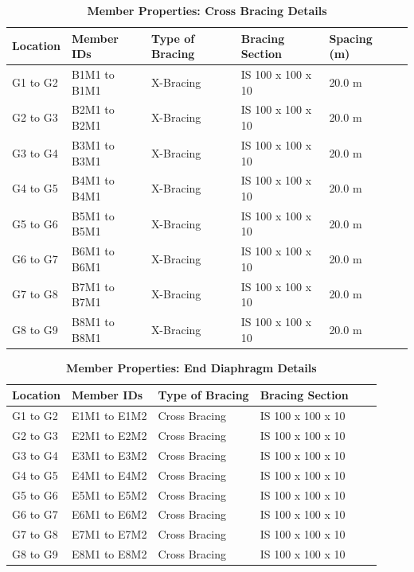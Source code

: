 \documentclass[12pt,a4paper]{report}
\numberwithin{table}{chapter}
\numberwithin{figure}{chapter}
\begin{document}
\newpage

\vspace{0.4em}
\setlength{\tabcolsep}{4pt}
\setlength\LTleft{0pt}
\setlength\LTright{\fill}

\begin{longtable}{|L{2.2cm}|L{2.2cm}|L{3.0cm}|L{2.5cm}|C{1.8cm}|C{1.8cm}|}
\caption{\textbf{Member Properties: Cross Bracing Details}}
\hline
\textbf{Location} & \textbf{Member IDs} & \textbf{Type of Bracing} & \textbf{Bracing Section} & \textbf{Spacing (m)} \\
\hline
G1 to G2 & B1M1 to B1M1 & X-Bracing & IS 100 x 100 x 10 & 20.0 m \\[6pt]
\hline
G2 to G3 & B2M1 to B2M1 & X-Bracing & IS 100 x 100 x 10 & 20.0 m \\[6pt]
\hline
G3 to G4 & B3M1 to B3M1 & X-Bracing & IS 100 x 100 x 10 & 20.0 m \\[6pt]
\hline
G4 to G5 & B4M1 to B4M1 & X-Bracing & IS 100 x 100 x 10 & 20.0 m \\[6pt]
\hline
G5 to G6 & B5M1 to B5M1 & X-Bracing & IS 100 x 100 x 10 & 20.0 m \\[6pt]
\hline
G6 to G7 & B6M1 to B6M1 & X-Bracing & IS 100 x 100 x 10 & 20.0 m \\[6pt]
\hline
G7 to G8 & B7M1 to B7M1 & X-Bracing & IS 100 x 100 x 10 & 20.0 m \\[6pt]
\hline
G8 to G9 & B8M1 to B8M1 & X-Bracing & IS 100 x 100 x 10 & 20.0 m \\[6pt]
\hline
\end{longtable}

\vspace{0.4em}
\noindent
\setlength{\tabcolsep}{4pt}
\setlength\LTleft{0pt}
\setlength\LTright{\fill}

\begin{longtable}{|L{2.2cm}|L{2.2cm}|L{3.0cm}|L{2.5cm}|C{1.8cm}|C{1.8cm}|}
\caption{\textbf{Member Properties: End Diaphragm Details}}
\hline
\textbf{Location} & \textbf{Member IDs} & \textbf{Type of Bracing} & \textbf{Bracing Section} \\
\hline
G1 to G2 & E1M1 to E1M2 & Cross Bracing & IS 100 x 100 x 10 \\[6pt]
\hline
G2 to G3 & E2M1 to E2M2 & Cross Bracing & IS 100 x 100 x 10 \\[6pt]
\hline
G3 to G4 & E3M1 to E3M2 & Cross Bracing & IS 100 x 100 x 10 \\[6pt]
\hline
G4 to G5 & E4M1 to E4M2 & Cross Bracing & IS 100 x 100 x 10 \\[6pt]
\hline
G5 to G6 & E5M1 to E5M2 & Cross Bracing & IS 100 x 100 x 10 \\[6pt]
\hline
G6 to G7 & E6M1 to E6M2 & Cross Bracing & IS 100 x 100 x 10 \\[6pt]
\hline
G7 to G8 & E7M1 to E7M2 & Cross Bracing & IS 100 x 100 x 10 \\[6pt]
\hline
G8 to G9 & E8M1 to E8M2 & Cross Bracing & IS 100 x 100 x 10 \\[6pt]
\hline
\end{longtable}
\end{document}
